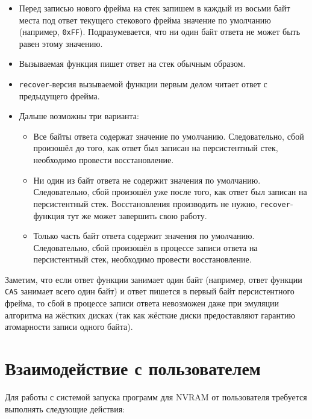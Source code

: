 \documentclass[times,specification,annotation]{itmo-student-thesis}
\begin{document}
\begin{itemize}
    \item Перед записью нового фрейма на стек запишем в каждый из восьми байт места под ответ текущего стекового фрейма значение по умолчанию (например, \texttt{0xFF}). Подразумевается, что ни один байт ответа не может быть равен этому значению.
    
    \item Вызываемая функция пишет ответ на стек обычным образом.
    
    \item \texttt{recover}-версия вызываемой функции первым делом читает ответ с предыдущего фрейма.
    
    \item Дальше возможны три варианта:
        \begin{itemize}
            \item Все байты ответа содержат значение по умолчанию. Следовательно, сбой произошёл до того, как ответ был записан на персистентный стек, необходимо провести восстановление.
            
            \item Ни один из байт ответа не содержит значения по умолчанию. Следовательно, сбой произошёл уже после того, как ответ был записан на персистентный стек. Восстановления производить не нужно, \texttt{recover}-функция тут же может завершить свою работу.
            
            \item Только часть байт ответа содержит значения по умолчанию. Следовательно, сбой произошёл в процессе записи ответа на персистентный стек, необходимо провести восстановление.
        \end{itemize}
\end{itemize}

Заметим, что если ответ функции занимает один байт (например, ответ функции \texttt{CAS} занимает всего один байт) и ответ пишется в первый байт персистентного фрейма, то сбой в процессе записи ответа невозможен даже при эмуляции алгоритма на жёстких дисках (так как жёсткие диски предоставляют гарантию атомарности записи одного байта).

\section{Взаимодействие с пользователем}

Для работы с системой запуска программ для NVRAM от пользователя требуется выполнять следующие действия:
\end{document}
